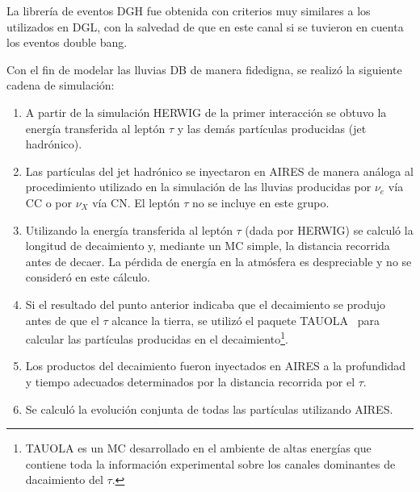 		La librería de eventos DGH fue obtenida con criterios muy similares a los utilizados en DGL, con la salvedad de que en este canal si se tuvieron en cuenta los eventos double bang.
		
		Con el fin de modelar las lluvias DB de manera fidedigna, se realizó la siguiente cadena de simulación:
		\begin{enumerate}
		\item A partir de la simulación HERWIG de la primer interacción se obtuvo la energía transferida al leptón $\tau$ y las demás partículas producidas (jet hadrónico).
		\item Las partículas del jet hadrónico se inyectaron en AIRES de manera análoga al procedimiento utilizado en la simulación de las lluvias producidas por $\nu_{e}$ vía CC o por $\nu_{X}$ vía CN. El leptón $\tau$ no se incluye en este grupo.
		\item Utilizando la energía transferida al leptón $\tau$ (dada por HERWIG) se calculó la longitud de decaimiento y, mediante un MC simple, la distancia recorrida antes de decaer. La pérdida de energía en la atmósfera es despreciable y no se consideró en este cálculo.
		\item Si el resultado del punto anterior indicaba que el decaimiento se produjo antes de que el $\tau$ alcance la tierra, se utilizó el paquete TAUOLA~\cite{cite:TAUOLA} para calcular las partículas producidas en el decaimiento\footnote{TAUOLA es un MC desarrollado en el ambiente de altas energías que contiene toda la información experimental sobre los canales dominantes de dacaimiento del $\tau$. }.
		\item Los productos del decaimiento fueron inyectados en AIRES a la profundidad y tiempo adecuados determinados por la distancia recorrida por el $\tau$.
		\item Se calculó la evolución conjunta de todas las partículas utilizando AIRES.
		\end{enumerate}
		
